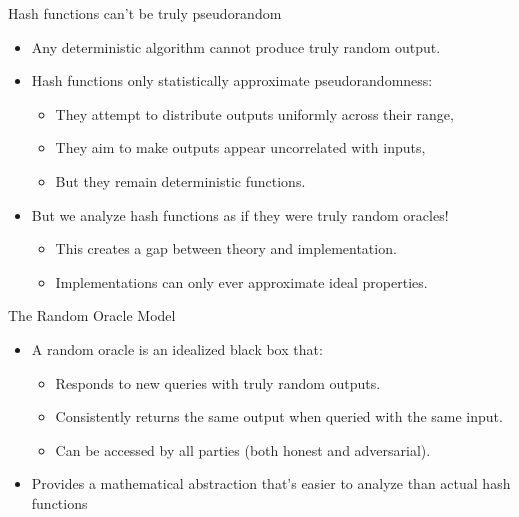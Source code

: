 \documentclass[aspectratio=169, lualatex, handout]{beamer}
\begin{document}
\begin{frame}{Hash functions can't be truly pseudorandom}
	\begin{itemize}[<+->]
		\item Any deterministic algorithm cannot produce truly random output.
		\item Hash functions only statistically approximate pseudorandomness:
		      \begin{itemize}
			      \item They attempt to distribute outputs uniformly across their range,
			      \item They aim to make outputs appear uncorrelated with inputs,
			      \item But they remain deterministic functions.
		      \end{itemize}
		\item But we analyze hash functions as if they were truly random oracles!
		      \begin{itemize}
			      \item This creates a gap between theory and implementation.
			      \item Implementations can only ever approximate ideal properties.
		      \end{itemize}
	\end{itemize}
\end{frame}

\begin{frame}{The Random Oracle Model}
	\begin{itemize}[<+->]
		\item A random oracle is an idealized black box that:
		      \begin{itemize}
			      \item Responds to new queries with truly random outputs.
			      \item Consistently returns the same output when queried with the same input.
			      \item Can be accessed by all parties (both honest and adversarial).
		      \end{itemize}
		\item Provides a mathematical abstraction that's easier to analyze than actual hash functions
	\end{itemize}
\end{frame}
\end{document}

